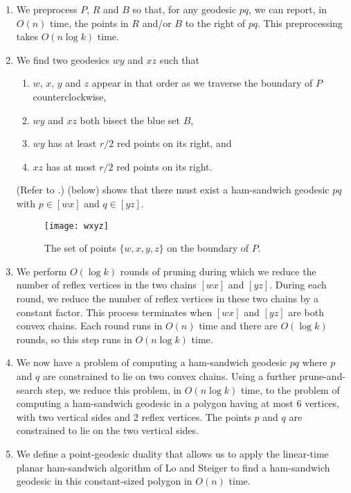 \documentclass[charterfonts,lotsofwhite]{patmorin}
\newcommand{\chain}[2]{[#1#2]}
\begin{document}
\begin{enumerate}

\item We preprocess $P$, $R$ and $B$ so that, for any geodesic $pq$,
we can report, in $O(n)$ time, the points in $R$ and/or $B$ to the
right of $pq$.  This preprocessing takes $O(n \log k)$ time.

\item We find two geodesics $wy$ and $xz$ such that

\begin{enumerate}

\item $w$, $x$, $y$ and $z$ appear in that order as we traverse the
boundary of $P$ counterclockwise,

\item $wy$ and $xz$ both bisect the blue set $B$,

\item $wy$ has at least $r/2$ red points on its right, and

\item $xz$ has at most $r/2$ red points on its right.

\end{enumerate}

(Refer to .)  (below) shows that there
must exist a ham-sandwich geodesic $pq$ with $p\in \chain{w}{x}$ and
$q\in \chain{y}{z}$.

\begin{figure}[htbp]
\begin{center}\texttt{[image: wxyz]}\end{center}
\caption{The set of points $\{w,x,y,z\}$ on the boundary of $P$.}
\end{figure}

\item We perform $O(\log k)$ rounds of pruning during which we reduce
the number of reflex vertices in the two chains $\chain{w}{x}$ and
$\chain{y}{z}$.  During each round, we reduce the number of reflex
vertices in these two chains by a constant factor.  This process
terminates when $\chain{w}{x}$ and $\chain{y}{z}$ are both convex chains.
Each round runs in $O(n)$ time and there are $O(\log k)$ rounds, so
this step runs in $O(n\log k)$ time.

\item We now have a problem of computing a ham-sandwich geodesic $pq$
where $p$ and $q$ are constrained to lie on two convex chains.  Using
a further prune-and-search step, we reduce this problem, in $O(n\log
k)$ time, to the problem of computing a ham-sandwich geodesic in a
polygon having at most 6 vertices, with two vertical sides and 2
reflex vertices.  The points $p$ and $q$ are constrained to lie on the
two vertical sides.

\item We define a point-geodesic duality that allows us to apply the
linear-time planar ham-sandwich algorithm of Lo and Steiger
\cite{ls90} to find a ham-sandwich geodesic in this constant-sized
polygon in $O(n)$ time.
\end{enumerate}
\end{document}
